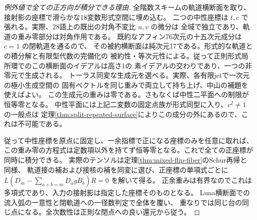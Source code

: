 \begin{proof}[例外値で全ての正方向が積分できる理由]
全階数スキームの軌道横断面を取り、接射影の座標で滑らかな18変数形式空間に埋め込む。
二つの中性座標は $t,c$ で張れる。実際、28語上の既出の対角不変比 $u,v$ の微分は
全域で独立であり、軌道の重み零部分は対角作用である。
既約なアフィン76次元の十五次元成分は $c=1$ の閉軌道を通るので、
その被約横断面は純次元17である。形式的な軌道との積分解と有限型代数の完備化の
被約性・等次元性による。従って正則形式局所環でのこの横断面のイデアルは高さ1の
素イデアルの交わりであり、一つの非零元で生成される。
トーラス同変な生成元を選べる。実際、各有限jetで一次元の極小生成空間の
固有ベクトルを同じ重みで両立して持ち上げ、中山の補題を使えばよい。
この生成元の重みは零である。さもなくば中性二平面への制限が恒等零となる。
中性平面には上記二変数の固定点族が形式同型に入り、$c^2\ne1$ の一般点は
定理\ref{thm:split-repeated-surface}によりこの成分の外にあるので、これは不可能である。

従って中性座標を原点に固定し、一余指標で正になる座標のみを任意に取れば、
この重み零の方程式は定数項以外を持てず恒等零となる。これで全ての正座標が同時に積分できる。
実際のテンソルは定理\ref{thm:mixed-flip-fiber}のSchur再帰と同様、
軌道接の補および接核の補を同変に選び、正座標の単項式ごとに
$L(D_m-\sum_{a+b=m}D_a g B_b)R=0$ を解いて得る。
正余重みは有界なのでこれは多項式であり、入力の接射影は指定した座標そのものとなる。
Luna横断面での流入弧の一意性と閉軌道への一径数判定で全体を覆い、
重なりでは同じ台の同じ点になる。全次数性は正則な閉点への良い還元から従う。
\end{proof}
